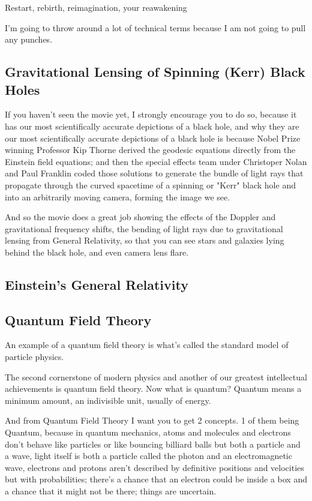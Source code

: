 \documentclass[10pt]{amsart}
\begin{document}
Restart, rebirth, reimagination, your reawakening

I'm going to throw around a lot of technical terms because I am not going to pull any punches.

\subsection{Gravitational Lensing of Spinning (Kerr) Black Holes}

If you haven't seen the movie yet, I strongly encourage you to do so, because it has our most scientifically accurate depictions of a black hole, and why they are our most scientifically accurate depictions of a black hole is because Nobel Prize winning Professor Kip Thorne derived the geodesic equations directly from the Einstein field equations; and then the special effects team under Christoper Nolan and Paul Franklin coded those solutions to generate the bundle of light rays that propagate through the curved spacetime of a spinning or "Kerr" black hole and into an arbitrarily moving camera, forming the image we see.

And so the movie does a great job showing the effects of the Doppler and gravitational frequency shifts, the bending of light rays due to gravitational lensing from General Relativity, so that you can see stars and galaxies lying behind the black hole, and even camera lens flare. 

\subsection{Einstein's General Relativity}



\subsection{Quantum Field Theory}

An example of a quantum field theory is what's called the standard model of particle physics. 

The second cornerstone of modern physics and another of our greatest intellectual achievements is quantum field theory. Now what is quantum? Quantum means a minimum amount, an indivisible unit, usually of energy.

And from Quantum Field Theory I want you to get 2 concepts. 1 of them being Quantum, because in quantum mechanics, atoms and molecules and electrons don't behave like particles or like bouncing billiard balls but both a particle and a wave, light itself is both a particle called the photon and an electromagnetic wave, electrons and protons aren't described by definitive positions and velocities but with probabilities; there's a chance that an electron could be inside a box and a chance that it might not be there; things are uncertain.
\end{document}

